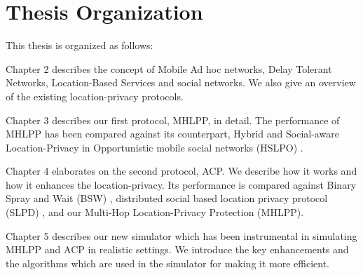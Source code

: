 \section{ Thesis Organization}

\noindent This thesis is organized as follows:

Chapter 2 describes the concept of Mobile Ad hoc networks, Delay Tolerant Networks, Location-Based Services and social networks. We also give an overview of the existing location-privacy protocols.

Chapter 3 describes our first protocol, MHLPP, in detail. The performance of MHLPP has been compared against its counterpart, Hybrid and Social-aware Location-Privacy in Opportunistic mobile social networks (HSLPO) \cite {C17}.

Chapter 4 elaborates on the second protocol, ACP. We describe how it works and how it enhances the location-privacy. Its performance is compared against Binary Spray and Wait (BSW) \cite{C31}, distributed social based location privacy protocol (SLPD) \cite{C16}, and our Multi-Hop Location-Privacy Protection (MHLPP).

Chapter 5 describes our new simulator which has been instrumental in simulating MHLPP and ACP in realistic settings. We introduce the key enhancements and the algorithms which are used in the simulator for making it more efficient.



\begin{comment}


\begin{figure}[H]
  \centering  
  \texttt{[image: figures/map2.pdf]}
  \caption{A map showing the organization of the thesis}
\end{figure}

\end{comment}
